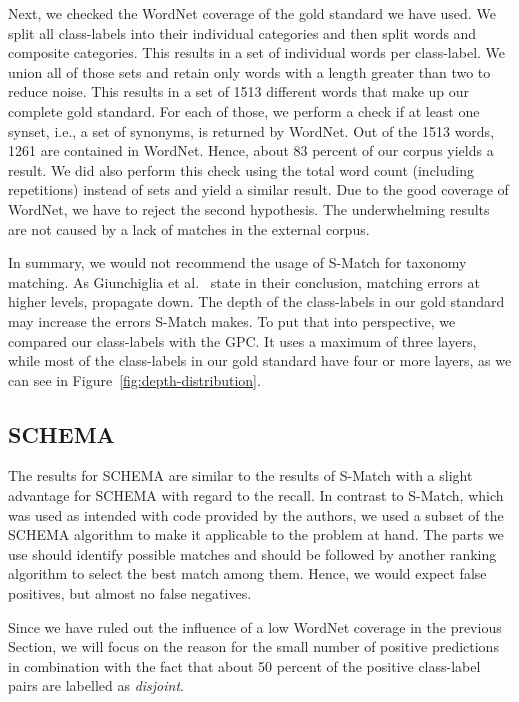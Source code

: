 Next, we checked the WordNet coverage of the gold standard we have used.
We split all class-labels into their individual categories and then split words and composite categories.
This results in a set of individual words per class-label.
We union all of those sets and retain only words with a length greater than  two to reduce noise.
This results in a set of 1513 different words that make up our complete gold standard.
For each of those, we perform a check if at least one synset, i.e., a set of synonyms, is returned by WordNet.
Out of the 1513 words, 1261 are contained in WordNet.
Hence, about 83 percent of our corpus yields a result.
We did also perform this check using the total word count (including repetitions) instead of sets and yield a
similar result.
Due to the good coverage of WordNet, we have to reject the second hypothesis.
The underwhelming results are not caused by a lack of matches in the external corpus.

In summary, we would not recommend the usage of S-Match for taxonomy matching.
As Giunchiglia et al.\@~\cite{giunchiglia2005semantic} state in their conclusion, matching errors at
higher levels, propagate down.
The depth of the class-labels in our gold standard may increase the errors S-Match makes.
To put that into perspective, we compared our class-labels with the GPC\@.
It uses a maximum of three layers, while most of the class-labels in our gold standard have four or more layers,
as we can see in Figure~\ref{fig:depth-distribution}.

\subsection{SCHEMA}

The results for SCHEMA are similar to the results of S-Match with a slight advantage for SCHEMA with regard to the recall.
In contrast to S-Match, which was used as intended with code provided by the authors, we used a subset of the SCHEMA
algorithm to make it applicable to the problem at  hand.
The parts we use should identify possible matches and should be followed by another ranking algorithm to select the best match
among them.
Hence, we would expect false positives, but almost no false negatives.

Since we have ruled out the influence of a low WordNet coverage in the previous Section, we will focus on the reason
for the small number of positive predictions in combination with the  fact that about 50 percent of the positive class-label
pairs are labelled as \emph{disjoint}.

